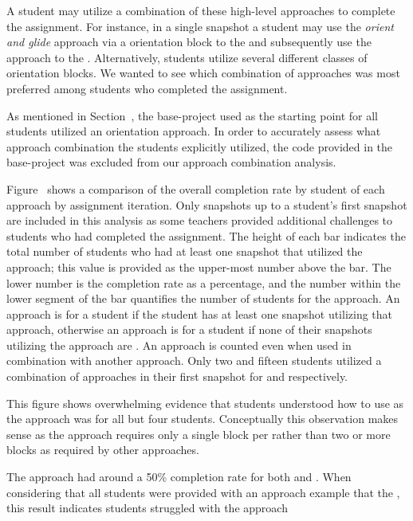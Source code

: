 A student may utilize a combination of these high-level approaches to complete
the assignment. For instance, in a single snapshot a student may use the
\emph{orient and glide} approach via a \rel{} orientation block to \catch{} the
\bear{} and subsequently use the \glideto{} approach to \catch{} the
\horse{}. Alternatively, students utilize several different classes of
orientation blocks. We wanted to see which combination of approaches was most
preferred among students who completed the assignment.

As mentioned in Section~, the base-project used as the
starting point for all students utilized an \abs{} orientation approach. In
order to accurately assess what approach combination the students explicitly
utilized, the code provided in the base-project was excluded from our approach
combination analysis.

Figure~ shows a comparison of the
overall completion rate by student of each approach by assignment
iteration. Only snapshots up to a student's first \com{} snapshot are included
in this analysis as some teachers provided additional challenges to students
who had completed the assignment. The height of each bar indicates the total
number of students who had at least one snapshot that utilized the approach;
this value is provided as the upper-most number above the bar. The lower number
is the completion rate as a percentage, and the number within the lower segment
of the bar quantifies the number of \com{} students for the approach. An
approach is \com{} for a student if the student has at least one \com{}
snapshot utilizing that approach, otherwise an approach is \incom{} for a
student if none of their snapshots utilizing the approach are \com{}. An
approach is counted even when used in combination with another approach. Only
two and fifteen students utilized a combination of approaches in their first
\com{} snapshot for \sone{} and \stwo{} respectively.

This figure shows overwhelming evidence that students understood how to use
\glideto{} as the approach was \com{} for all but four students. Conceptually
this observation makes sense as the approach requires only a single block per
\catch{} rather than two or more blocks as required by other approaches.

The \abs{} approach had around a 50\% completion rate for both \sone{} and
\stwo{}. When considering that all students were provided with an \abs{}
approach example that  the \zebra{}, this result indicates students
struggled with the \abs{} approach

